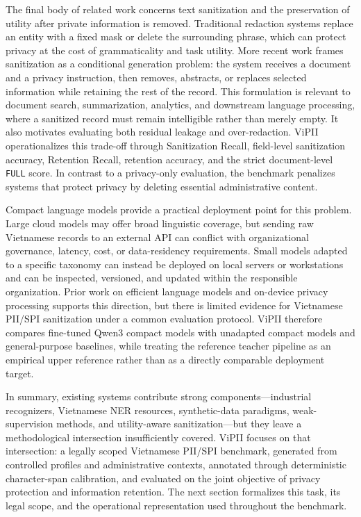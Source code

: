 \documentclass[
]{article}
\begin{document}
The final body of related work concerns text sanitization and the
preservation of utility after private information is removed.
Traditional redaction systems replace an entity with a fixed mask or
delete the surrounding phrase, which can protect privacy at the cost of
grammaticality and task utility. More recent work frames sanitization as
a conditional generation problem: the system receives a document and a
privacy instruction, then removes, abstracts, or replaces selected
information while retaining the rest of the record. This formulation is
relevant to document search, summarization, analytics, and downstream
language processing, where a sanitized record must remain intelligible
rather than merely empty. It also motivates evaluating both residual
leakage and over-redaction. ViPII operationalizes this trade-off through
Sanitization Recall, field-level sanitization accuracy, Retention
Recall, retention accuracy, and the strict document-level \texttt{FULL}
score. In contrast to a privacy-only evaluation, the benchmark penalizes
systems that protect privacy by deleting essential administrative
content.

Compact language models provide a practical deployment point for this
problem. Large cloud models may offer broad linguistic coverage, but
sending raw Vietnamese records to an external API can conflict with
organizational governance, latency, cost, or data-residency
requirements. Small models adapted to a specific taxonomy can instead be
deployed on local servers or workstations and can be inspected,
versioned, and updated within the responsible organization. Prior work
on efficient language models and on-device privacy processing supports
this direction, but there is limited evidence for Vietnamese PII/SPI
sanitization under a common evaluation protocol. ViPII therefore
compares fine-tuned Qwen3 compact models with unadapted compact models
and general-purpose baselines, while treating the reference teacher
pipeline as an empirical upper reference rather than as a directly
comparable deployment target.

In summary, existing systems contribute strong components---industrial
recognizers, Vietnamese NER resources, synthetic-data paradigms,
weak-supervision methods, and utility-aware sanitization---but they
leave a methodological intersection insufficiently covered. ViPII
focuses on that intersection: a legally scoped Vietnamese PII/SPI
benchmark, generated from controlled profiles and administrative
contexts, annotated through deterministic character-span calibration,
and evaluated on the joint objective of privacy protection and
information retention. The next section formalizes this task, its legal
scope, and the operational representation used throughout the benchmark.
\end{document}
